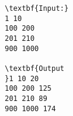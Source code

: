 \begin{verbatim}
\textbf{Input:}
1 10 
100 200 
201 210 
900 1000

\textbf{Output
}1 10 20
100 200 125
201 210 89
900 1000 174
\end{verbatim}